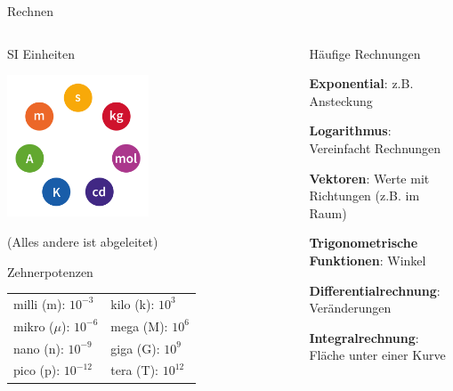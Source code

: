 \documentclass{beamer}
\begin{document}
\begin{frame}{Rechnen}
    


\begin{columns}[c]
\begin{column}{6cm}

\begin{block}{SI Einheiten}
\begin{center}
    \includegraphics[width=0.5\textwidth]{SI_base_units.png}
\end{center}


(Alles andere ist abgeleitet)
\end{block}

\begin{block}{Zehnerpotenzen}

\begin{tabular}{l|l}
milli (m): \(10^{-3}\)   & kilo  (k):  \(10^{3}\)    \\
mikro (\(\mu\)): \(10^{-6}\)   & mega  (M):  \(10^{6}\)    \\
nano (n):  \(10^{-9}\)   & giga  (G):  \(10^{9}\)    \\
pico (p): \(10^{-12}\)  & tera  (T): \(10^{12}\)   \\

\end{tabular}


\end{block}





\end{column}

\begin{column}{5cm}


\begin{block}{Häufige Rechnungen}
\item
\textbf{Exponential}: z.B. Ansteckung 
\item
\textbf{Logarithmus}: Vereinfacht Rechnungen
\item
\textbf{Vektoren}: Werte mit Richtungen (z.B. im Raum)
\item
\textbf{Trigonometrische Funktionen}: Winkel
\item
\textbf{Differentialrechnung}: Veränderungen 
\item
\textbf{Integralrechnung}: Fläche unter einer Kurve
\end{block}




\end{column}
\end{columns}
\end{frame}
\end{document}
